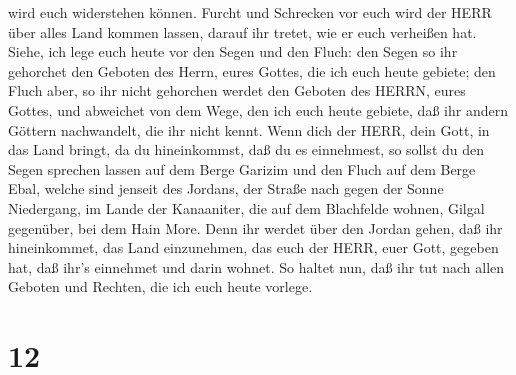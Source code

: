 wird euch widerstehen können. Furcht und Schrecken vor euch wird der
HERR über alles Land kommen lassen, darauf ihr tretet, wie er euch
verheißen hat.  Siehe, ich lege euch heute vor den Segen
und den Fluch:  den Segen so ihr gehorchet den Geboten des
Herrn, eures Gottes, die ich euch heute gebiete;  den Fluch
aber, so ihr nicht gehorchen werdet den Geboten des HERRN, eures Gottes,
und abweichet von dem Wege, den ich euch heute gebiete, daß ihr andern
Göttern nachwandelt, die ihr nicht kennt.  Wenn dich der
HERR, dein Gott, in das Land bringt, da du hineinkommst, daß du es
einnehmest, so sollst du den Segen sprechen lassen auf dem Berge Garizim
und den Fluch auf dem Berge Ebal,  welche sind jenseit des
Jordans, der Straße nach gegen der Sonne Niedergang, im Lande der
Kanaaniter, die auf dem Blachfelde wohnen, Gilgal gegenüber, bei dem
Hain More.  Denn ihr werdet über den Jordan gehen, daß ihr
hineinkommet, das Land einzunehmen, das euch der HERR, euer Gott,
gegeben hat, daß ihr's einnehmet und darin wohnet.  So
haltet nun, daß ihr tut nach allen Geboten und Rechten, die ich euch
heute vorlege.

\hypertarget{section-11}{%
\section{12}\label{section-11}}

